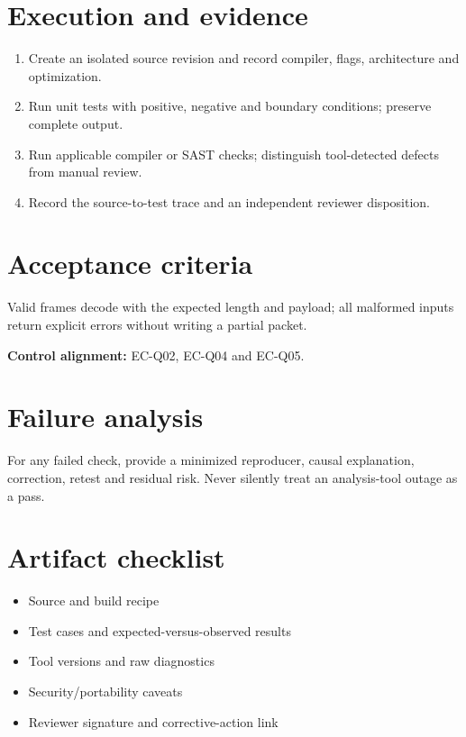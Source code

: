\documentclass[10pt,letterpaper]{article}
\begin{document}
\section{Execution and evidence}
\begin{enumerate}
\item Create an isolated source revision and record compiler, flags, architecture and optimization.
\item Run unit tests with positive, negative and boundary conditions; preserve complete output.
\item Run applicable compiler or SAST checks; distinguish tool-detected defects from manual review.
\item Record the source-to-test trace and an independent reviewer disposition.
\end{enumerate}

\section{Acceptance criteria}
Valid frames decode with the expected length and payload; all malformed inputs return explicit errors without writing a partial packet.

\textbf{Control alignment:} EC-Q02, EC-Q04 and EC-Q05.
\section{Failure analysis}
For any failed check, provide a minimized reproducer, causal explanation, correction, retest and residual risk. Never silently treat an analysis-tool outage as a pass.
\section{Artifact checklist}
\begin{itemize}
\item Source and build recipe
\item Test cases and expected-versus-observed results
\item Tool versions and raw diagnostics
\item Security/portability caveats
\item Reviewer signature and corrective-action link
\end{itemize}
\end{document}
